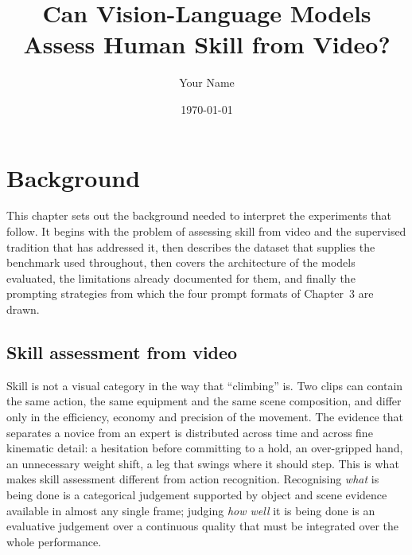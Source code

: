 \documentclass[logo,msc]{infthesis}
\begin{document}
\begin{preliminary}
\title{Can Vision-Language Models Assess Human Skill from Video?}
\author{Your Name}
\date{\today}
\maketitle
\tableofcontents
\end{preliminary}

\chapter{Background}

This chapter sets out the background needed to interpret the experiments
that follow. It begins with the problem of assessing skill from video and
the supervised tradition that has addressed it, then describes the dataset
that supplies the benchmark used throughout, then covers the architecture
of the models evaluated, the limitations already documented for them, and
finally the prompting strategies from which the four prompt formats of
Chapter~3 are drawn.

\section{Skill assessment from video}

Skill is not a visual category in the way that ``climbing'' is. Two clips
can contain the same action, the same equipment and the same scene
composition, and differ only in the efficiency, economy and precision of
the movement. The evidence that separates a novice from an expert is
distributed across time and across fine kinematic detail: a hesitation
before committing to a hold, an over-gripped hand, an unnecessary weight
shift, a leg that swings where it should step. This is what makes skill
assessment different from action recognition. Recognising \emph{what} is
being done is a categorical judgement supported by object and scene
evidence available in almost any single frame; judging \emph{how well} it
is being done is an evaluative judgement over a continuous quality that
must be integrated over the whole performance.
\end{document}
